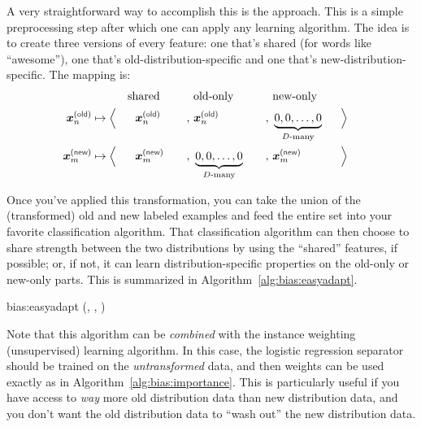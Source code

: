 A very straightforward way to accomplish this is the  approach. This is a simple preprocessing step after which one can apply any learning algorithm. The idea is to create three versions of every feature: one that's shared (for words like ``awesome''), one that's old-distribution-specific and one that's new-distribution-specific. The mapping is:
~
\begin{alignat}{6}
&&& \text{shared} && \text{old-only} && \text{new-only} \nonumber \\
\vxold_n &\mapsto \Big\langle && ~~\vxold_n\quad &,~& \vxold_n                                       &,~& \underbrace{0, 0, \dots, 0}_{D\text{-many}} &~~& \Big\rangle \\
\vxnew_m &\mapsto \Big\langle && ~~\vxnew_m\quad &,~& \underbrace{0, 0, \dots, 0}_{D\text{-many}}\quad &,~& \vxnew_m                                  &~~& \Big\rangle
\end{alignat}

Once you've applied this transformation, you can take the union of the (transformed) old and new labeled examples and feed the entire set into your favorite classification algorithm.
That classification algorithm can then choose to share strength between the two distributions by using the ``shared'' features, if possible;
or, if not, it can learn distribution-specific properties on the old-only or new-only parts.
This is summarized in Algorithm~\ref{alg:bias:easyadapt}.

\newalgorithm%
  {bias:easyadapt}%
  {(, , \VAR{$\cA$})}
  {
     \\ 
     
  }

Note that this algorithm can be \emph{combined} with the instance weighting (unsupervised) learning algorithm. In this case, the logistic regression separator should be trained on the \emph{untransformed} data, and then weights can be used exactly as in Algorithm~\ref{alg:bias:importance}. This is particularly useful if you have access to \emph{way} more old distribution data than new distribution data, and you don't want the old distribution data to ``wash out'' the new distribution data.

